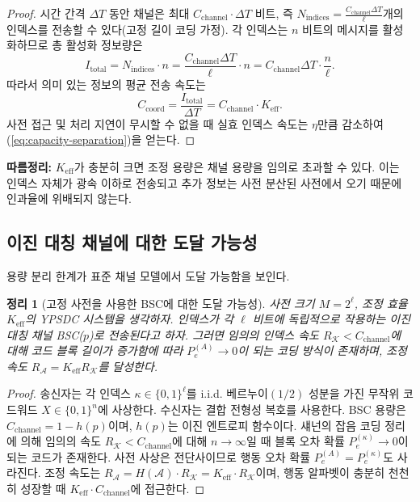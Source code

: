 \documentclass[12pt,a4paper]{article}
\newcommand{\Keff}{K_{\mathrm{eff}}}
\newtheorem{theorem}{정리}[section]
\begin{document}
	\begin{proof}
		시간 간격 $\Delta T$ 동안 채널은 최대 $C_{\text{channel}} \cdot \Delta T$ 비트, 즉 $N_{\text{indices}} = \frac{C_{\text{channel}} \Delta T}{\ell}$개의 인덱스를 전송할 수 있다(고정 길이 코딩 가정). 각 인덱스는 $n$ 비트의 메시지를 활성화하므로 총 활성화 정보량은
		\[
		I_{\text{total}} = N_{\text{indices}} \cdot n = \frac{C_{\text{channel}} \Delta T}{\ell} \cdot n = C_{\text{channel}} \Delta T \cdot \frac{n}{\ell}.
		\]
		따라서 의미 있는 정보의 평균 전송 속도는
		\[
		C_{\text{coord}} = \frac{I_{\text{total}}}{\Delta T} = C_{\text{channel}} \cdot \Keff.
		\]
		사전 접근 및 처리 지연이 무시할 수 없을 때 실효 인덱스 속도는 $\eta$만큼 감소하여 (\ref{eq:capacity-separation})을 얻는다.
	\end{proof}
	
	\noindent
	\textbf{따름정리:} $\Keff$가 충분히 크면 조정 용량은 채널 용량을 임의로 초과할 수 있다. 이는 인덱스 자체가 광속 이하로 전송되고 추가 정보는 사전 분산된 사전에서 오기 때문에 인과율에 위배되지 않는다.
	
	\subsection{이진 대칭 채널에 대한 도달 가능성}
	\label{subsec:BSC-achievability}
	
	용량 분리 한계가 표준 채널 모델에서 도달 가능함을 보인다.
	
	\begin{theorem}[고정 사전을 사용한 BSC에 대한 도달 가능성]
		사전 크기 $M = 2^\ell$, 조정 효율 $K_{\mathrm{eff}}$의 YPSDC 시스템을 생각하자. 인덱스가 각 $\ell$ 비트에 독립적으로 작용하는 이진 대칭 채널 BSC($p$)로 전송된다고 하자. 그러면 임의의 인덱스 속도 $R_{\mathcal{K}} < C_{\mathrm{channel}}$에 대해 코드 블록 길이가 증가함에 따라 $P_e^{(A)} \to 0$이 되는 코딩 방식이 존재하며, 조정 속도 $R_{\mathcal{A}} = K_{\mathrm{eff}} R_{\mathcal{K}}$를 달성한다.
	\end{theorem}
	
	\begin{proof}
		송신자는 각 인덱스 $\kappa \in \{0,1\}^\ell$를 i.i.d. 베르누이$(1/2)$ 성분을 가진 무작위 코드워드 $X \in \{0,1\}^n$에 사상한다. 수신자는 결합 전형성 복호를 사용한다. BSC 용량은 $C_{\mathrm{channel}} = 1 - h(p)$이며, $h(p)$는 이진 엔트로피 함수이다. 섀넌의 잡음 코딩 정리에 의해 임의의 속도 $R_{\mathcal{K}} < C_{\mathrm{channel}}$에 대해 $n \to \infty$일 때 블록 오차 확률 $P_e^{(\kappa)} \to 0$이 되는 코드가 존재한다. 사전 사상은 전단사이므로 행동 오차 확률 $P_e^{(A)} = P_e^{(\kappa)}$도 사라진다. 조정 속도는 $R_{\mathcal{A}} = H(\mathcal{A}) \cdot R_{\mathcal{K}} = K_{\mathrm{eff}} \cdot R_{\mathcal{K}}$이며, 행동 알파벳이 충분히 천천히 성장할 때 $K_{\mathrm{eff}} \cdot C_{\mathrm{channel}}$에 접근한다.
	\end{proof}
	
\end{document}
